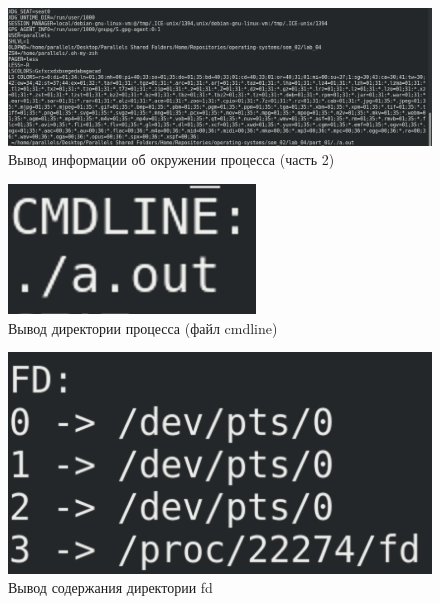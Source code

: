 \begin{figure}[H]
    \centering
    \includegraphics[scale=0.4]{img/part_01/env_02.png}
    \caption{Вывод информации об окружении процесса (часть 2)}
\end{figure}

\begin{figure}[H]
    \centering
    \includegraphics{img/part_01/cmdline.png}
    \caption{Вывод директории процесса (файл {\ttfamily cmdline})}
\end{figure}

\begin{figure}[H]
    \centering
    \includegraphics{img/part_01/fd.png}
    \caption{Вывод содержания директории {\ttfamily fd}}
\end{figure}

